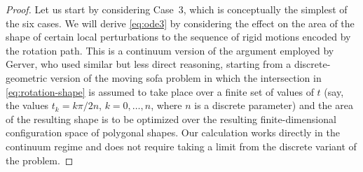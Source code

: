 \documentclass[11pt]{article}
\begin{document}
\begin{proof} 
Let us start by considering Case~3, which is conceptually the simplest of the six cases. We will derive \eqref{eq:ode3} by considering the effect on the area of the shape of certain local perturbations to the sequence of rigid motions encoded by the rotation path. This is a continuum version of the argument employed by Gerver, who used similar but less direct reasoning, starting from a discrete-geometric version of the moving sofa problem in which the intersection in \eqref{eq:rotation-shape} is assumed to take place over a finite set of values of $t$ (say, the values $t_k=k \pi/2n$, $k=0,\ldots,n$, where $n$ is a discrete parameter) and the area of the resulting shape is to be optimized over the resulting finite-dimensional configuration space of polygonal shapes. Our calculation works directly in the continuum regime and does not require taking a limit from the discrete variant of the problem.


\end{proof}
\end{document}
